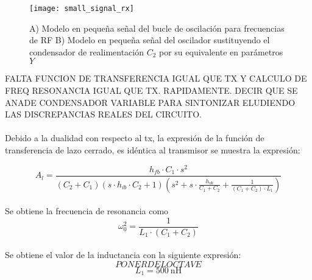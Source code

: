 \begin{figure}[h]
    \centering
    \texttt{[image: small\_signal\_rx]}
    \caption{A) Modelo en pequeña señal del bucle de oscilación para frecuencias de RF B) Modelo en pequeña señal del oscilador sustituyendo el condensador de realimentación $C_2$ por su equivalente en parámetros $Y$}
    \label{fig:ss_rx}
\end{figure}

FALTA FUNCION DE TRANSFERENCIA IGUAL QUE TX Y CALCULO DE FREQ RESONANCIA IGUAL QUE TX. RAPIDAMENTE. DECIR QUE SE ANADE CONDENSADOR VARIABLE PARA SINTONIZAR ELUDIENDO LAS DISCREPANCIAS REALES DEL CIRCUITO.
\paragraph{}
Debido a la dualidad con respecto al tx, la expresión de la función de transferencia de lazo cerrado, es idéntica al transmisor se muestra la expresión:

\begin{equation}
   \label{eq:Al_tx}
   A_l = \frac{h_{fb} \cdot C_1 \cdot s^2}{ \left( C_2+C_1 \right) \left( s \cdot h_{ib} \cdot C_2 + 1\right) \left( s^2 + s \cdot \frac{h_{ob}}{C_1 + C_2} + \frac{1}{(C_1 + C_2)\cdot L_1}\right) }
\end{equation}

\paragraph{}
Se obtiene la frecuencia de resonancia como $$\omega_0^2 = \frac{1}{L_1 \cdot (C_1 + C_2)}$$
\paragraph{}
Se obtiene el valor de la inductancia con la siguiente expresi\'on:
\begin{equation}
	\label{eq:inductance}
PONER DEL OCTAVE
\end{equation}
$$ L_1 = \SI{500}{\nano\henry} $$


